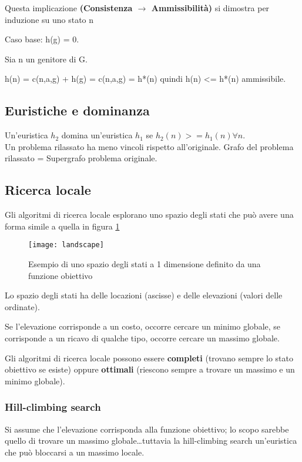 Questa implicazione \textbf{(Consistenza $\rightarrow$ Ammissibilità)}
si dimostra per induzione su uno stato n

Caso base:
h(g) = 0.

Sia n un genitore di G.

h(n) = c(n,a,g) + h(g) = c(n,a,g) = h*(n) quindi h(n) <= h*(n) ammissibile.

\subsection{Euristiche e dominanza}

Un'euristica $h_2$ domina un'euristica $h_1$ se $h_2(n) >= h_1(n) \forall n$.\\

Un problema rilassato ha meno vincoli rispetto all'originale.
Grafo del problema rilassato = Supergrafo problema originale.

\subsection{Ricerca locale}

Gli algoritmi di ricerca locale esplorano uno spazio degli stati che può avere
una forma simile a quella in figura \ref{fig:landscape}

\begin{figure}[H]
\centering
\texttt{[image: landscape]}
\caption{Esempio di uno spazio degli stati a 1 dimensione definito da una
funzione obiettivo}
\label{fig:landscape}
\end{figure}

Lo spazio degli stati ha delle locazioni (ascisse) e delle elevazioni
(valori delle ordinate).

Se l'elevazione corrisponde a un costo, occorre cercare un minimo globale,
se corrisponde a un ricavo di qualche tipo, occorre cercare un massimo globale.

Gli algoritmi di ricerca locale possono essere \textbf{completi} (trovano
sempre lo stato obiettivo se esiste) oppure \textbf{ottimali} (riescono sempre a
trovare un massimo e un minimo globale).

\subsubsection{Hill-climbing search}

Si assume che l'elevazione corrisponda alla funzione obiettivo; lo scopo
sarebbe quello di trovare un massimo globale\dots tuttavia la hill-climbing
search un'euristica che può bloccarsi a un massimo locale.

